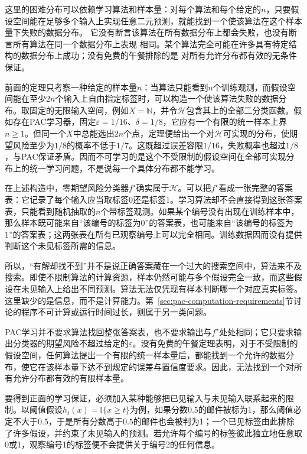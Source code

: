 这里的困难分布可以依赖学习算法和样本量：对每个算法和每个给定的$n$，只要假设空间能在足够多个输入上实现任意二元预测，就能找到一个使该算法在这个样本量下失败的数据分布。
它没有断言该算法在所有数据分布上都会失败，也没有断言所有算法在同一个数据分布上表现
相同。某个算法完全可能在许多具有特定结构的数据分布上成功；没有免费的午餐排除的是
对所有允许分布都有效的无条件保证。

前面的定理只考察一种给定的样本量$n$：当算法只能看到$n$个训练观测，而假设空间能在至少$2n$个输入上自由指定标签时，可以构造一个使该算法失败的数据分布。取固定的无限输入空间，例如$X=\mathbb N$，并令$\mathcal H$包含其上的全部二分类函数。假如存在PAC学习器，固定$\varepsilon=1/16$、$\delta=1/8$，它应有一个有限的统一样本上界$n\geq1$。但同一个$X$中总能选出$2n$个点，定理便给出一个对$\mathcal H$可实现的分布，使期望风险至少为$1/8$的概率不低于$1/7$。这既超过误差容限$1/16$，失败概率也超过$1/8$，与PAC保证矛盾。因而不可学习的是这个不受限制的假设空间在全部可实现分布上的统一学习问题，不是说每一个具体分布都不能学习。

在上述构造中，零期望风险分类器$f^\star$确实属于$\mathcal H$。可以把$f^\star$看成一张完整的答案表：它记录了每个输入应当取标签0还是标签1。学习算法却不会直接得到这张答案表，只能看到随机抽取的$n$个带标签观测。如果某个编号没有出现在训练样本中，那么样本既可能来自“该编号的标签为0”的答案表，也可能来自“该编号的标签为1”的答案表；这两张表在所有已观察编号上可以完全相同。训练数据因而没有提供判断这个未见标签所需的信息。

所以，“有解却找不到”并不是说正确答案藏在一个过大的搜索空间中，算法来不及搜索。即使不限制算法的计算资源，样本仍然可能与多个假设完全一致，而这些假设在未见输入上给出不同预测。算法无法仅凭现有样本判断哪一个对应真实标签。这里缺少的是信息，而不是计算能力。第~\ref{sec:pac-computation-requirements}节讨论的程序不可计算或运行时间过长，则属于另一类问题。

PAC学习并不要求算法找回整张答案表，也不要求输出与$f^\star$处处相同；它只要求输出分类器的期望风险不超过给定的$\varepsilon$。没有免费的午餐定理表明，对于不受限制的假设空间，任何算法提出一个有限的统一样本量后，都能找到一个允许的数据分布，使它在该样本量下达不到规定的误差与置信度要求。因此，无法找到一个对所有允许分布都有效的有限样本量。

要得到正面的学习保证，必须加入某种能够把已见输入与未见输入联系起来的限制。以阈值假设$h_t(x)=\mathbb I\{x\geq t\}$为例，如果分数$0.5$的邮件被标为1，那么阈值必定不大于$0.5$，于是所有分数高于$0.5$的邮件也会被判为1；一个已见标签由此排除了许多假设，并约束了未见输入的预测。若允许每个编号的标签彼此独立地任意取0或1，观察编号1的标签便不会提供关于编号2的任何信息。

